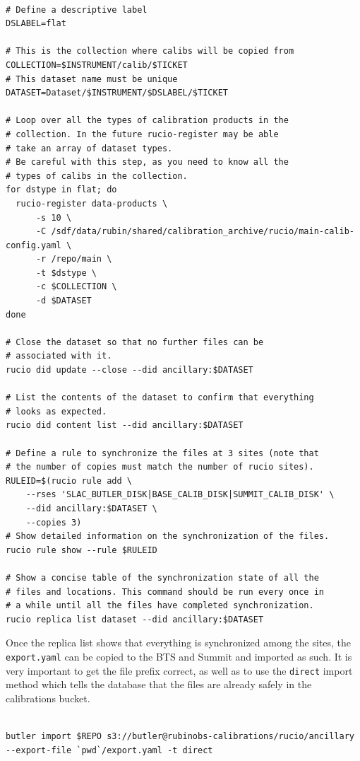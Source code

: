 \documentclass[DM,authoryear,toc]{lsstdoc}
\begin{document}
\begin{verbatim}

# Define a descriptive label
DSLABEL=flat

# This is the collection where calibs will be copied from
COLLECTION=$INSTRUMENT/calib/$TICKET
# This dataset name must be unique
DATASET=Dataset/$INSTRUMENT/$DSLABEL/$TICKET

# Loop over all the types of calibration products in the
# collection. In the future rucio-register may be able
# take an array of dataset types.
# Be careful with this step, as you need to know all the
# types of calibs in the collection.
for dstype in flat; do
  rucio-register data-products \
      -s 10 \
      -C /sdf/data/rubin/shared/calibration_archive/rucio/main-calib-config.yaml \
      -r /repo/main \
      -t $dstype \
      -c $COLLECTION \
      -d $DATASET
done

# Close the dataset so that no further files can be
# associated with it.
rucio did update --close --did ancillary:$DATASET

# List the contents of the dataset to confirm that everything
# looks as expected.
rucio did content list --did ancillary:$DATASET

# Define a rule to synchronize the files at 3 sites (note that
# the number of copies must match the number of rucio sites).
RULEID=$(rucio rule add \
    --rses 'SLAC_BUTLER_DISK|BASE_CALIB_DISK|SUMMIT_CALIB_DISK' \
    --did ancillary:$DATASET \
    --copies 3)
# Show detailed information on the synchronization of the files.
rucio rule show --rule $RULEID

# Show a concise table of the synchronization state of all the
# files and locations. This command should be run every once in
# a while until all the files have completed synchronization.
rucio replica list dataset --did ancillary:$DATASET

\end{verbatim}

Once the replica list shows that everything is synchronized among the sites, the \texttt{export.yaml} can be copied to the BTS and Summit and imported as such.
It is very important to get the file prefix correct, as well as to use the \texttt{direct} import method which tells the database that the files are already safely in the calibrations bucket.

\begin{verbatim}

butler import $REPO s3://butler@rubinobs-calibrations/rucio/ancillary --export-file `pwd`/export.yaml -t direct

\end{verbatim}
\end{document}
